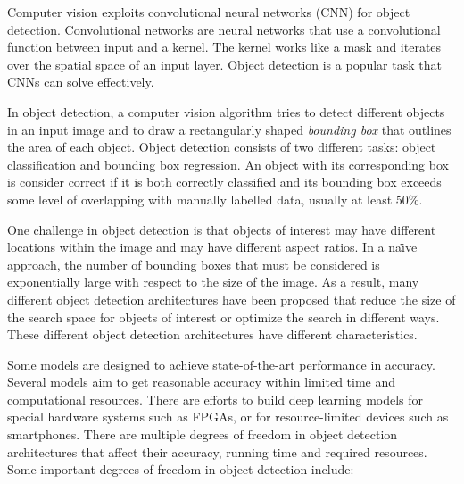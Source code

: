 \documentclass[conference]{IEEEtran}
\newcommand{\alnote}[1]{ {\textcolor{blue} { ***andre: #1 }}}
\newcommand{\alnote}[1]{}
\begin{document}
Computer vision exploits convolutional neural networks (CNN) for object detection. 
Convolutional networks are neural networks that use a convolutional function between input and a kernel. The kernel works like a mask and iterates over the spatial space of an input layer. 
Object detection is a popular task that CNNs can solve effectively. 



In object detection, a computer vision algorithm tries to detect different objects in an input image and to draw a rectangularly shaped {\em bounding box} that outlines the area of each object. 
Object detection consists of two different tasks: object classification and bounding box regression. 
An object with its corresponding box is consider correct if it is both correctly classified and its bounding box exceeds some level of overlapping with manually labelled data, usually at least 50\%. 

One challenge in object detection is that objects of interest may have different locations within the image and may have different aspect ratios.  
In a na\"{\i}ve approach, the number of bounding boxes that must be considered is exponentially large with respect to the size of the image.  
As a result, many different object detection architectures have been proposed that reduce the size of the search space for objects of interest or optimize the search in different ways.  
These different object detection architectures have different characteristics. 

Some models are designed to achieve state-of-the-art performance in accuracy. 
Several models aim to get reasonable accuracy within limited time and computational resources. 
There are efforts to build deep learning models for special hardware systems such as FPGAs, or for resource-limited devices such as smartphones. 
There are multiple degrees of freedom in object detection architectures that affect their accuracy, running time and required resources.   Some important degrees of freedom in object detection include:
\end{document}
